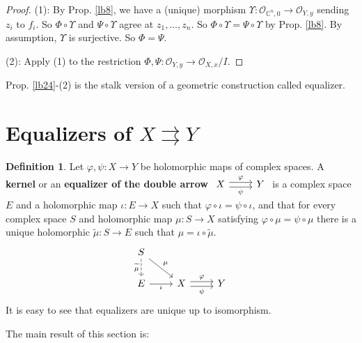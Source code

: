 \documentclass[12pt,b5paper,notitlepage]{report}
\theoremstyle{definition}
\newtheorem{df}{Definition}[section]
\theoremstyle{plain}
\newcommand{\wtd}{\widetilde}
\newcommand{\scr}{\mathscr}
\newcommand{\Cbb}{\mathbb C}
\numberwithin{equation}{section}
\begin{document}
\begin{proof}
(1): By Prop. \ref{lb8}, we have a (unique) morphism $\Upsilon:\scr O_{\Cbb^n,0}\rightarrow\scr O_{Y,y}$ sending $z_i$ to $f_i$. So $\Phi\circ\Upsilon$ and $\Psi\circ\Upsilon$ agree at $z_1,\dots,z_n$. So $\Phi\circ\Upsilon=\Psi\circ\Upsilon$ by Prop. \ref{lb8}. By assumption, $\Upsilon$ is surjective. So $\Phi=\Psi$. 

(2): Apply (1) to the restriction $\Phi,\Psi:\scr O_{Y,y}\rightarrow\scr O_{X,x}/I$.
\end{proof}


Prop. \ref{lb24}-(2) is the stalk version of a geometric construction called equalizer.


\section{Equalizers of $X\rightrightarrows Y$}

\begin{df}
Let $\varphi,\psi:X\rightarrow Y$ be holomorphic maps of complex spaces. A  \textbf{kernel} or an \textbf{equalizer of the double arrow} $\begin{tikzcd}
X \arrow[r,shift left, "\varphi"] \arrow[r,shift right,"\psi"'] & Y
\end{tikzcd}$
is a complex space $E$ and a holomorphic map $\iota:E\rightarrow X$ such that $\varphi\circ\iota=\psi\circ\iota$, and that for every complex space $S$ and holomorphic map $\mu:S\rightarrow X$ satisfying $\varphi\circ\mu=\psi\circ\mu$ there is a unique holomorphic $\wtd\mu:S\rightarrow E$ such that $\mu=\iota\circ\wtd\mu$.
\begin{equation}\label{eq17}
\begin{tikzcd}
S \arrow[rd, "\mu"] \arrow[d, "{\wtd\mu}"', dashed] &                                                           &   \\
E \arrow[r, "\iota"']                   & X \arrow[r, "\psi"', shift right] \arrow[r, "\varphi", shift left] & Y
\end{tikzcd}
\end{equation}
It is easy to see that equalizers are unique up to isomorphism.
\end{df}

The main result of this section is:
\end{document}
